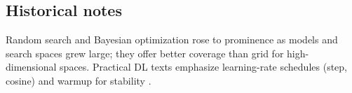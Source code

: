 \subsection{Historical notes}

Random search and Bayesian optimization rose to prominence as models and search spaces grew large; they offer better coverage than grid for high-dimensional spaces. Practical DL texts emphasize learning-rate schedules (step, cosine) and warmup for stability \textcite{GoodfellowEtAl2016,Prince2023,D2LChapterOptimization}.


